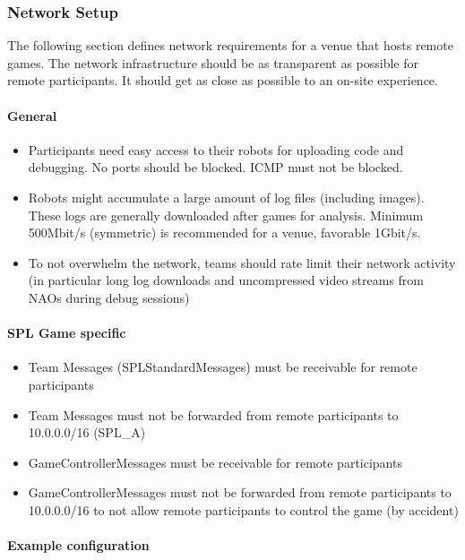 \subsubsection{Network Setup}
The following section defines network requirements for a venue that hosts remote games. The network infrastructure should be as transparent as possible for remote participants. It should get as close as possible to an on-site experience.

\paragraph{General}

\begin{itemize}
    \item Participants need easy access to their robots for uploading code and debugging. No ports should be blocked. ICMP must not be blocked.
    \item Robots might accumulate a large amount of log files (including images). These logs are generally downloaded after games for analysis. Minimum 500Mbit/s (symmetric) is recommended for a venue, favorable 1Gbit/s.
    \item To not overwhelm the network, teams should rate limit their network activity (in particular long log downloads and uncompressed video streams from NAOs during debug sessions)
\end{itemize}

\paragraph{SPL Game specific}

\begin{itemize}
    \item Team Messages (SPLStandardMessages) must be receivable for remote participants
    \item Team Messages must not be forwarded from remote participants to 10.0.0.0/16 (SPL\_A)
    \item GameControllerMessages must be receivable for remote participants
    \item GameControllerMessages must not be forwarded from remote participants to 10.0.0.0/16 to not allow remote participants to control the game (by accident)
\end{itemize}

\paragraph{Example configuration}

